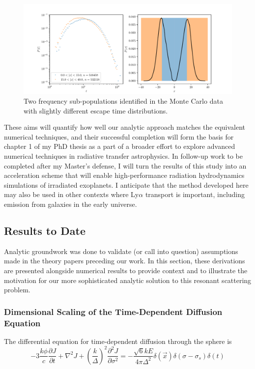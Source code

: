 \documentclass[onecolumn]{aastex63}
\begin{document}
\begin{figure}
    \centering
    \includegraphics[width=\textwidth]{t-escape_frequency-study.pdf}
    \caption{Two frequency sub-populations identified in the Monte Carlo data with slightly different escape time distributions.}
    \label{mc_freqs}
\end{figure}

 These aims will quantify how well our analytic approach matches the equivalent numerical techniques, and their successful completion will form the basis for chapter 1 of my PhD thesis as a part of a broader effort to explore advanced numerical techniques in radiative transfer astrophysics. In follow-up work to be completed after my Master's defense, I will turn the results of this study into an acceleration scheme that will enable high-performance radiation hydrodynamics simulations of irradiated exoplanets. I anticipate that the method developed here may also be used in other contexts where Ly$\alpha$ transport is important, including emission from galaxies in the early universe.

\subsection{Results to Date}

Analytic groundwork was done to validate (or call into question) assumptions made in the theory papers preceding our work. In this section, these derivations are presented alongside numerical results to provide context and to illustrate the motivation for our more sophisticated analytic solution to this resonant scattering problem.

\subsubsection{Dimensional Scaling of the Time-Dependent Diffusion Equation}

The differential equation for time-dependent diffusion through the sphere is 
\begin{equation}
    -3 \frac{k\phi}{c} \frac{\partial J}{\partial t} + \nabla^2 J + \left( \frac{k}{\Delta} \right)^2 \frac{\partial^2 J}{\partial \sigma^2} = - \frac{\sqrt{6} kE}{4\pi \Delta^2} \delta(\vec{x}) \delta (\sigma - \sigma_s ) \delta (t)
        \label{timedependent}
\end{equation}
\end{document}
